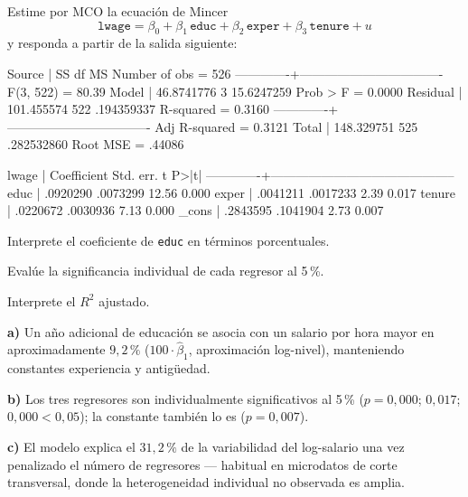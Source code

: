\documentclass{evaluacion}
\begin{document}
\begin{ejercicio}
Estime por MCO la ecuación de Mincer
\[
  \texttt{lwage} = \beta_0 + \beta_1\,\texttt{educ}
  + \beta_2\,\texttt{exper} + \beta_3\,\texttt{tenure} + u
\]
y responda a partir de la salida siguiente:

\begin{salida}
      Source |       SS           df       MS      Number of obs   =       526
-------------+----------------------------------   F(3, 522)       =     80.39
       Model |  46.8741776         3  15.6247259   Prob > F        =    0.0000
    Residual |  101.455574       522  .194359337   R-squared       =    0.3160
-------------+----------------------------------   Adj R-squared   =    0.3121
       Total |  148.329751       525  .282532860   Root MSE        =    .44086

       lwage | Coefficient  Std. err.      t    P>|t|
-------------+--------------------------------------------
        educ |   .0920290   .0073299    12.56   0.000
       exper |   .0041211   .0017233     2.39   0.017
      tenure |   .0220672   .0030936     7.13   0.000
       _cons |   .2843595   .1041904     2.73   0.007
\end{salida}

\begin{apartados}
  \item Interprete el coeficiente de \texttt{educ} en términos
        porcentuales. 
  \item Evalúe la significancia individual de cada regresor al 5\,\%. 
  \item Interprete el $R^{2}$ ajustado. 
\end{apartados}
\begin{solucion}
\textbf{a)} Un año adicional de educación se asocia con un salario por
hora mayor en aproximadamente $9{,}2\,\%$
($100\cdot\hat\beta_1$, aproximación log-nivel), manteniendo constantes
experiencia y antigüedad.

\textbf{b)} Los tres regresores son individualmente significativos al
5\,\% ($p = 0{,}000$; $0{,}017$; $0{,}000 < 0{,}05$); la constante también
lo es ($p=0{,}007$).

\textbf{c)} El modelo explica el $31{,}2\,\%$ de la variabilidad del
log-salario una vez penalizado el número de regresores — habitual en
microdatos de corte transversal, donde la heterogeneidad individual no
observada es amplia.
\end{solucion}
\end{ejercicio}
\end{document}
